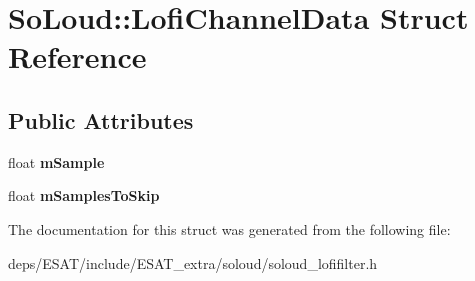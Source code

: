 \hypertarget{struct_so_loud_1_1_lofi_channel_data}{}\section{So\+Loud\+:\+:Lofi\+Channel\+Data Struct Reference}
\label{struct_so_loud_1_1_lofi_channel_data}
\subsection*{Public Attributes}
\begin{DoxyCompactItemize}
\item 
\mbox{\label{struct_so_loud_1_1_lofi_channel_data_ae11de05f305ae215b5f9256e42970819}} 
float {\bfseries m\+Sample}
\item 
\mbox{\label{struct_so_loud_1_1_lofi_channel_data_abefcb30d3db32987f2e18f587475fe89}} 
float {\bfseries m\+Samples\+To\+Skip}
\end{DoxyCompactItemize}


The documentation for this struct was generated from the following file\+:\begin{DoxyCompactItemize}
\item 
deps/\+E\+S\+A\+T/include/\+E\+S\+A\+T\+\_\+extra/soloud/soloud\+\_\+lofifilter.\+h\end{DoxyCompactItemize}
